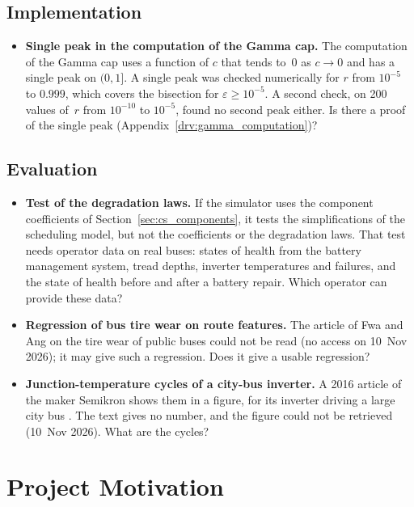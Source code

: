 \documentclass[11pt,a4paper]{article}
\theoremstyle{plain}
\theoremstyle{definition}
\theoremstyle{remark}
\begin{document}
\subsection{Implementation}

\begin{itemize}
  \item \textbf{Single peak in the computation of the Gamma cap.}
    The computation of the Gamma cap uses a function of $c$ that tends to~$0$ as $c \to 0$ and has a single peak on $(0, 1]$.
    A single peak was checked numerically for $r$ from $10^{-5}$ to $0.999$, which covers the bisection for $\varepsilon \ge 10^{-5}$.
    A second check, on 200 values of~$r$ from $10^{-10}$ to $10^{-5}$, found no second peak either.
    Is there a proof of the single peak (Appendix~\ref{drv:gamma_computation})?
\end{itemize}

\subsection{Evaluation}

\begin{itemize}
  \item \textbf{Test of the degradation laws.}
    If the simulator uses the component coefficients of Section~\ref{sec:cs_components}, it tests the simplifications of the scheduling model, but not the coefficients or the degradation laws.
    That test needs operator data on real buses: states of health from the battery management system, tread depths, inverter temperatures and failures, and the state of health before and after a battery repair.
    Which operator can provide these data?
  \item \textbf{Regression of bus tire wear on route features.}
    The article of Fwa and Ang on the tire wear of public buses \cite{FwaAng1991} could not be read (no access on 10~Nov 2026); it may give such a regression.
    Does it give a usable regression?
  \item \textbf{Junction-temperature cycles of a city-bus inverter.}
    A 2016 article of the maker Semikron shows them in a figure, for its inverter driving a large city bus \cite{Backhaus2016}.
    The text gives no number, and the figure could not be retrieved (10~Nov 2026).
    What are the cycles?
\end{itemize}

\section{Project Motivation}
\label{sec:motivation}
\end{document}
